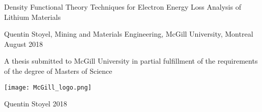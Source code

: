 \begin{titlepage}
    \begin{center}
        \vspace*{1cm}
        \huge
        {Density Functional Theory Techniques for Electron Energy Loss Analysis of Lithium Materials}
        
       
        
        
        
        \vspace{1.5cm}
        
        \large
        {Quentin Stoyel, Mining and Materials Engineering, McGill University, Montreal}\\
        
        {August 2018}
        
        
       \normalsize
       A thesis submitted to McGill University in partial fulfillment of the requirements of the degree of Masters of Science
        
		\vfill
        
		\texttt{[image: McGill\_logo.png]}
        
        {\textcopyright Quentin Stoyel 2018}
    \end{center}

\end{titlepage}

